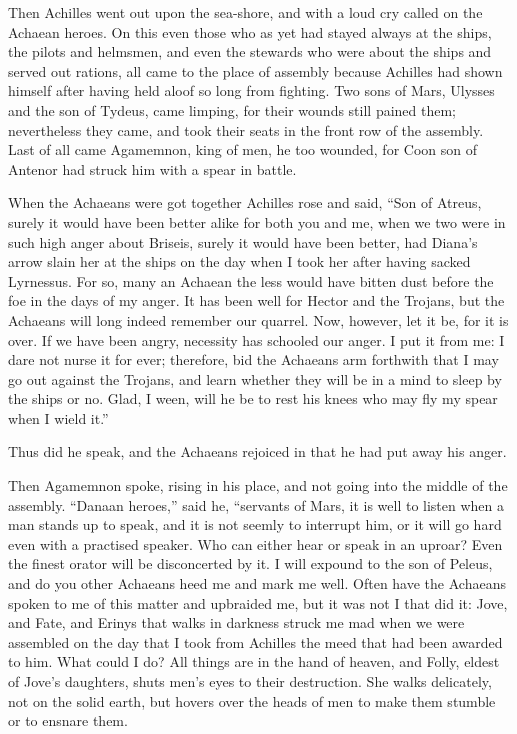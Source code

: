 Then Achilles went out upon the sea-shore, and with a loud cry called on
the Achaean heroes. On this even those who as yet had stayed always at the
ships, the pilots and helmsmen, and even the stewards who were about the
ships and served out rations, all came to the place of assembly because
Achilles had shown himself after having held aloof so long from fighting.
Two sons of Mars, Ulysses and the son of Tydeus, came limping, for their
wounds still pained them; nevertheless they came, and took their seats in
the front row of the assembly. Last of all came Agamemnon, king of men, he
too wounded, for Coon son of Antenor had struck him with a spear in
battle.

When the Achaeans were got together Achilles rose and said, “Son of
Atreus, surely it would have been better alike for both you and me, when
we two were in such high anger about Briseis, surely it would have been
better, had Diana’s arrow slain her at the ships on the day when I took
her after having sacked Lyrnessus. For so, many an Achaean the less would
have bitten dust before the foe in the days of my anger. It has been well
for Hector and the Trojans, but the Achaeans will long indeed remember our
quarrel. Now, however, let it be, for it is over. If we have been angry,
necessity has schooled our anger. I put it from me: I dare not nurse it
for ever; therefore, bid the Achaeans arm forthwith that I may go out
against the Trojans, and learn whether they will be in a mind to sleep by
the ships or no. Glad, I ween, will he be to rest his knees who may fly my
spear when I wield it.”

Thus did he speak, and the Achaeans rejoiced in that he had put away his
anger.

Then Agamemnon spoke, rising in his place, and not going into the middle
of the assembly. “Danaan heroes,” said he, “servants of Mars, it is well
to listen when a man stands up to speak, and it is not seemly to interrupt
him, or it will go hard even with a practised speaker. Who can either hear
or speak in an uproar? Even the finest orator will be disconcerted by it.
I will expound to the son of Peleus, and do you other Achaeans heed me and
mark me well. Often have the Achaeans spoken to me of this matter and
upbraided me, but it was not I that did it: Jove, and Fate, and Erinys
that walks in darkness struck me mad when we were assembled on the day
that I took from Achilles the meed that had been awarded to him. What
could I do? All things are in the hand of heaven, and Folly, eldest of
Jove’s daughters, shuts men’s eyes to their destruction. She walks
delicately, not on the solid earth, but hovers over the heads of men to
make them stumble or to ensnare them.


